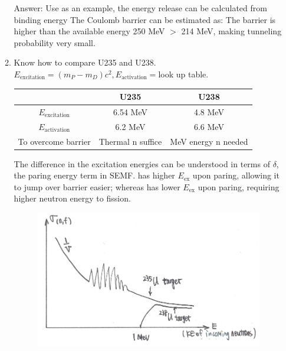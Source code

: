 \documentclass{school-22.101-notes}
\begin{document}
\begin{enumerate}
\begin{enumerate}
Answer: Use   as an example, the energy release can be calculated from binding energy
The Coulomb barrier can be estimated as:
The barrier is higher than the available energy 250 MeV $>$ 214 MeV, making tunneling probability very small. 
\item Know how to compare U235 and U238. $E_{\mathrm{excitation}} = (m_P - m_D)c^2, E_{\mathrm{activation}} = $look up table. 
\begin{table}[ht]
    \centering
    \begin{tabular}{|c|c|c|} \hline
    & U235 & U238  \\ \hline
    $E_{\mathrm{excitation}}$ & 6.54 MeV & 4.8 MeV \\ \hline
    $E_{\mathrm{activation}}$ & 6.2  MeV & 6.6 MeV \\ \hline
    To overcome barrier & Thermal n suffice & MeV energy n needed \\ \hline
    \end{tabular}
\end{table}
The difference in the excitation energies can be understood in terms of $\delta$, the paring energy term in SEMF.  has higher $E_{\mathrm{ex}}$ upon paring, allowing it to jump over barrier easier; whereas  has lower $E_{\mathrm{ex}}$ upon paring, requiring higher neutron energy to fission. 
\begin{figure}[ht]
   \centering
   \includegraphics[width=4in]{images/ni/KE-incoming-neutron.png}
\end{figure}
\end{enumerate}


\end{enumerate}
\end{document}
